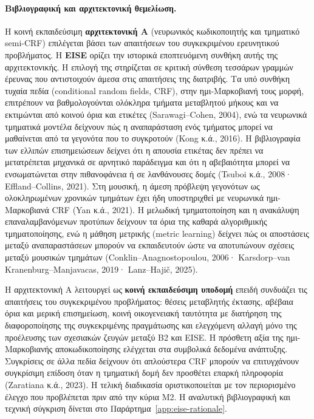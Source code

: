 \documentclass[11pt,a4paper]{article}
\begin{document}
\paragraph{Βιβλιογραφική και αρχιτεκτονική θεμελίωση.}
Η κοινή εκπαιδεύσιμη \textbf{αρχιτεκτονική A} (νευρωνικός κωδικοποιητής και τμηματικό semi-CRF) επιλέγεται βάσει των απαιτήσεων του συγκεκριμένου ερευνητικού προβλήματος. Η \textbf{EISE} ορίζει την ιστορικά εποπτευόμενη συνθήκη αυτής της αρχιτεκτονικής. Η επιλογή της στηρίζεται σε κριτική σύνθεση τεσσάρων γραμμών έρευνας που αντιστοιχούν άμεσα στις απαιτήσεις της διατριβής. Τα υπό συνθήκη τυχαία πεδία (conditional random fields, CRF), στην ημι-Μαρκοβιανή τους μορφή, επιτρέπουν να βαθμολογούνται ολόκληρα τμήματα μεταβλητού μήκους και να εκτιμώνται από κοινού όρια και ετικέτες (Sarawagi--Cohen, 2004), ενώ τα νευρωνικά τμηματικά μοντέλα δείχνουν πώς η αναπαράσταση ενός τμήματος μπορεί να μαθαίνεται από τα γεγονότα που το συγκροτούν (Kong κ.ά., 2016). Η βιβλιογραφία των ελλιπών επισημειώσεων δείχνει ότι η απουσία ετικέτας δεν πρέπει να μετατρέπεται μηχανικά σε αρνητικό παράδειγμα και ότι η αβεβαιότητα μπορεί να ενσωματώνεται στην πιθανοφάνεια ή σε λανθάνουσες δομές (Tsuboi κ.ά., 2008· Effland--Collins, 2021). Στη μουσική, η άμεση πρόβλεψη γεγονότων ως ολοκληρωμένων χρονικών τμημάτων έχει ήδη υποστηριχθεί με νευρωνικά ημι-Μαρκοβιανά CRF (Yan κ.ά., 2021). Η μελωδική τμηματοποίηση και η ανακάλυψη επαναλαμβανόμενων προτύπων δείχνουν τα όρια της καθαρά αλγοριθμικής τμηματοποίησης, ενώ η μάθηση μετρικής (metric learning) δείχνει πώς οι αποστάσεις μεταξύ αναπαραστάσεων μπορούν να εκπαιδευτούν ώστε να αποτυπώνουν σχέσεις μεταξύ μουσικών τμημάτων (Conklin--Anagnostopoulou, 2006· Karsdorp--van Kranenburg--Manjavacas, 2019· Lanz--Hajič, 2025).

Η αρχιτεκτονική A λειτουργεί ως \textbf{κοινή εκπαιδεύσιμη υποδομή} επειδή συνδυάζει τις απαιτήσεις του συγκεκριμένου προβλήματος: θέσεις μεταβλητής έκτασης, αβέβαια όρια και μερική επισημείωση, κοινή οικογενειακή ταυτότητα με διατήρηση της διαφοροποίησης της συγκεκριμένης πραγμάτωσης και ελεγχόμενη αλλαγή μόνο της προέλευσης των σχεσιακών ζευγών μεταξύ B2 και EISE. Η πρόσθετη αξία της ημι-Μαρκοβιανής αποκωδικοποίησης ελέγχεται στα συμβολικά δεδομένα ανάπτυξης. Συγκρίσεις σε άλλα πεδία δείχνουν ότι απλούστερα CRF μπορούν να επιτυγχάνουν συγκρίσιμη επίδοση όταν η τμηματική δομή δεν προσθέτει επαρκή πληροφορία (Zaratiana κ.ά., 2023). Η τελική διαδικασία οριστικοποιείται με τον περιορισμένο έλεγχο που προβλέπεται πριν από την κύρια M2. Η αναλυτική βιβλιογραφική και τεχνική σύγκριση δίνεται στο Παράρτημα~\ref{app:eise-rationale}.
\end{document}

